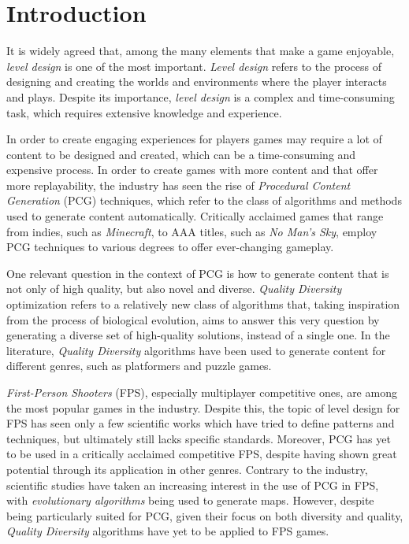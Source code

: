 \chapter{Introduction}
\label{ch:introduction}

It is widely agreed that, among the many elements that make a game enjoyable, \textit{level design} is one of the most important. \textit{Level design} refers to the process of designing and creating the worlds and environments where the player interacts and plays. Despite its importance, \textit{level design} is a complex and time-consuming task, which requires extensive knowledge and experience. 

In order to create engaging experiences for players games may require a lot of content to be designed and created, which can be a time-consuming and expensive process. In order to create games with more content and that offer more replayability, the industry has seen the rise of \textit{Procedural Content Generation} (PCG) techniques, which refer to the class of algorithms and methods used to generate content automatically. Critically acclaimed games that range from indies, such as \textit{Minecraft}, to AAA titles, such as \textit{No Man's Sky}, employ PCG techniques to various degrees to offer ever-changing gameplay. 

One relevant question in the context of PCG is how to generate content that is not only of high quality, but also novel and diverse. \textit{Quality Diversity} optimization refers to a relatively new class of algorithms that, taking inspiration from the process of biological evolution, aims to answer this very question by generating a diverse set of high-quality solutions, instead of a single one. In the literature, \textit{Quality Diversity} algorithms have been used to generate content for different genres, such as platformers and puzzle games.

\textit{First-Person Shooters} (FPS), especially multiplayer competitive ones, are among the most popular games in the industry. Despite this, the topic of level design for FPS has seen only a few scientific works which have tried to define patterns and techniques, but ultimately still lacks specific standards. Moreover, PCG has yet to be used in a critically acclaimed competitive FPS, despite having shown great potential through its application in other genres. Contrary to the industry, scientific studies have taken an increasing interest in the use of PCG in FPS, with \textit{evolutionary algorithms} being used to generate maps. However, despite being particularly suited for PCG, given their focus on both diversity and quality, \textit{Quality Diversity} algorithms have yet to be applied to FPS games.

